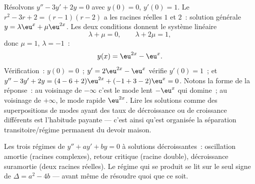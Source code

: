 \begin{example}\label{ex:b1:diffeq:cauchy2}
Résolvons $y'' - 3y' + 2y = 0$ avec $y(0) = 0$, $y'(0) = 1$. Le
 $r^2 - 3r + 2 = (r - 1)(r - 2)$ a les racines
réelles $1$ et $2$~: solution générale $y = \lambda\eu^{x} +
\mu\eu^{2x}$. Les deux conditions donnent le système linéaire
\[
\lambda + \mu = 0, \qquad \lambda + 2\mu = 1 ,
\]
donc $\mu = 1$, $\lambda = -1$~:
\[
y(x) = \eu^{2x} - \eu^{x} .
\]
Vérification~: $y(0) = 0$~; $y' = 2\eu^{2x} - \eu^x$ vérifie $y'(0) =
1$~; et $y'' - 3y' + 2y = (4 - 6 + 2)\eu^{2x} + (-1 + 3 - 2)\eu^x =
0$. Notons la forme de la réponse~: au voisinage de $-\infty$ c'est le
mode lent $-\eu^x$ qui domine~; au voisinage de $+\infty$, le mode
rapide $\eu^{2x}$. Lire les solutions comme des superpositions de
modes ayant des taux de décroissance ou de croissance différents est
l'habitude payante --- c'est ainsi qu'est organisée la séparation
transitoire/régime permanent du devoir maison.
\end{example}

\begin{omfigure}

{\small Les trois régimes de $y'' + ay' + by = 0$ à solutions
décroissantes~: oscillation amortie (racines complexes), retour
critique (racine double), décroissance suramortie (deux racines
réelles). Le régime qui se produit se lit sur le seul signe de $\Delta
= a^2 - 4b$ --- avant même de résoudre quoi que ce soit.}
\end{omfigure}

